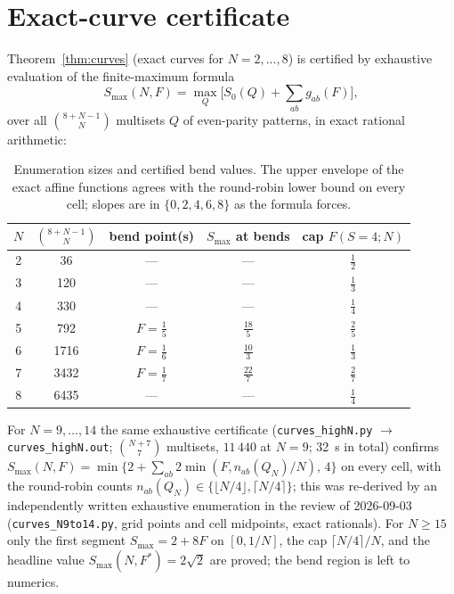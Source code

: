 \documentclass[aps,pra,reprint,superscriptaddress,floatfix]{revtex4-2}
\begin{document}
\section{Exact-curve certificate}
\label{supp:curves}

Theorem~\ref{thm:curves} (exact curves for $N=2,\dots,8$) is certified by
exhaustive evaluation of the finite-maximum formula
\begin{equation}
S_{\max}(N,F)=\max_Q\bigl[S_0(Q)+\textstyle\sum_{ab}g_{ab}(F)\bigr],
\end{equation}
over all $\binom{8+N-1}{N}$ multisets $Q$ of even-parity patterns, in exact
rational arithmetic:

\begin{table}[htbp]
\centering
\small
\begin{tabular}{@{}ccccc@{}}
\toprule
$N$ & $\binom{8+N-1}{N}$ & bend point(s) & $S_{\max}$ at bends & cap $F(S{=}4;N)$\\ \midrule
2 & 36 & --- & --- & $\tfrac12$\\
3 & 120 & --- & --- & $\tfrac13$\\
4 & 330 & --- & --- & $\tfrac14$\\
5 & 792 & $F=\tfrac15$ & $\tfrac{18}{5}$ & $\tfrac25$\\
6 & 1716 & $F=\tfrac16$ & $\tfrac{10}{3}$ & $\tfrac13$\\
7 & 3432 & $F=\tfrac17$ & $\tfrac{22}{7}$ & $\tfrac27$\\
8 & 6435 & --- & --- & $\tfrac14$\\ \bottomrule
\end{tabular}
\caption{Enumeration sizes and certified bend values. The upper envelope of
the exact affine functions agrees with the round-robin lower bound on every
cell; slopes are in $\{0,2,4,6,8\}$ as the formula forces.}
\label{tab:enum}
\end{table}

For $N=9,\dots,14$ the same exhaustive certificate
(\texttt{curves\_highN.py} $\to$ \texttt{curves\_highN.out};
$\binom{N+7}{7}$ multisets, $11\,440$ at $N=9$; 32~s in total) confirms
$S_{\max}(N,F)=\min\{2+\sum_{ab}2\min(F,n_{ab}(Q_N)/N),\,4\}$ on every cell,
with the round-robin counts $n_{ab}(Q_N)\in\{\lfloor N/4\rfloor,\lceil
N/4\rceil\}$; this was re-derived by an independently written exhaustive
enumeration in the review of 2026-09-03 (\texttt{curves\_N9to14.py}, grid
points and cell midpoints, exact rationals). For $N\ge15$ only the first segment $S_{\max}=2+8F$ on
$[0,1/N]$, the cap $\lceil N/4\rceil/N$, and the headline value
$S_{\max}(N,F^*)=2\sqrt2$ are proved; the bend region is left to numerics.
\end{document}
